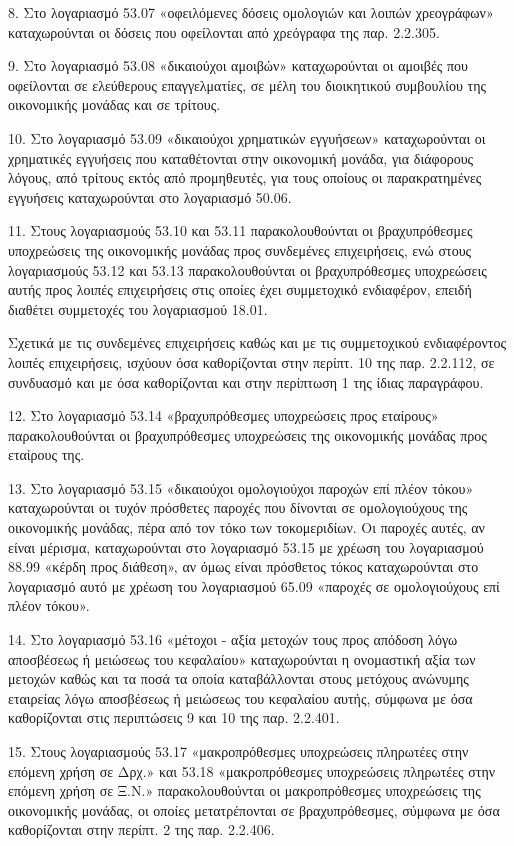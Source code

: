 \documentclass[A4,10pt,greek]{book}
\begin{document}
8. Στο λογαριασμό 53.07 «οφειλόμενες δόσεις ομολογιών και λοιπών χρεογράφων» καταχωρούνται οι δόσεις που οφείλονται από χρεόγραφα της παρ. 2.2.305.

9. Στο λογαριασμό 53.08 «δικαιούχοι αμοιβών» καταχωρούνται οι αμοιβές που οφείλονται σε ελεύθερους επαγγελματίες, σε μέλη του διοικητικού συμβουλίου της οικονομικής μονάδας και σε τρίτους.

10. Στο λογαριασμό 53.09 «δικαιούχοι χρηματικών εγγυήσεων» καταχωρούνται οι χρηματικές εγγυήσεις που καταθέτονται στην οικονομική μονάδα, για διάφορους λόγους, από τρίτους εκτός από προμηθευτές, για τους οποίους οι παρακρατημένες εγγυήσεις καταχωρούνται στο λογαριασμό 50.06.

11. Στους λογαριασμούς 53.10 και 53.11 παρακολουθούνται οι βραχυπρόθεσμες υποχρεώσεις της οικονομικής μονάδας προς συνδεμένες επιχειρήσεις, ενώ στους λογαριασμούς 53.12 και 53.13 παρακολουθούνται οι βραχυπρόθεσμες υποχρεώσεις αυτής προς λοιπές επιχειρήσεις στις οποίες έχει συμμετοχικό ενδιαφέρον, επειδή διαθέτει συμμετοχές του λογαριασμού 18.01.

Σχετικά με τις συνδεμένες επιχειρήσεις καθώς και με τις συμμετοχικού ενδιαφέροντος λοιπές επιχειρήσεις, ισχύουν όσα καθορίζονται στην περίπτ. 10 της παρ. 2.2.112, σε συνδυασμό και με όσα καθορίζονται και στην περίπτωση 1 της ίδιας παραγράφου.

12. Στο λογαριασμό 53.14 «βραχυπρόθεσμες υποχρεώσεις προς εταίρους» παρακολουθούνται οι βραχυπρόθεσμες υποχρεώσεις της οικονομικής μονάδας προς εταίρους της.

13. Στο λογαριασμό 53.15 «δικαιούχοι ομολογιούχοι παροχών επί πλέον τόκου» καταχωρούνται οι τυχόν πρόσθετες παροχές που δίνονται σε ομολογιούχους της οικονομικής μονάδας, πέρα από τον τόκο των τοκομεριδίων. Οι παροχές αυτές, αν είναι μέρισμα, καταχωρούνται στο λογαριασμό 53.15 με χρέωση του λογαριασμού 88.99 «κέρδη προς διάθεση», αν όμως είναι πρόσθετος τόκος καταχωρούνται στο λογαριασμό αυτό με χρέωση του λογαριασμού 65.09 «παροχές σε ομολογιούχους επί πλέον τόκου».

14. Στο λογαριασμό 53.16 «μέτοχοι - αξία μετοχών τους προς απόδοση λόγω αποσβέσεως ή μειώσεως του κεφαλαίου» καταχωρούνται η ονομαστική αξία των μετοχών καθώς και τα ποσά τα οποία καταβάλλονται στους μετόχους ανώνυμης εταιρείας λόγω αποσβέσεως ή μειώσεως του κεφαλαίου αυτής, σύμφωνα με όσα καθορίζονται στις περιπτώσεις 9 και 10 της παρ. 2.2.401.

15. Στους λογαριασμούς 53.17 «μακροπρόθεσμες υποχρεώσεις πληρωτέες στην επόμενη χρήση σε Δρχ.» και 53.18 «μακροπρόθεσμες υποχρεώσεις πληρωτέες στην επόμενη χρήση σε Ξ.Ν.» παρακολουθούνται οι μακροπρόθεσμες υποχρεώσεις της οικονομικής μονάδας, οι οποίες μετατρέπονται σε βραχυπρόθεσμες, σύμφωνα με όσα καθορίζονται στην περίπτ. 2 της παρ. 2.2.406.
\end{document}
